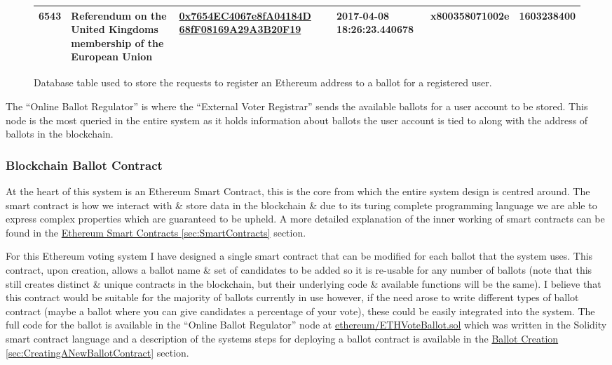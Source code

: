 \documentclass{article}
\begin{document}
\begin{figure}[h]
{\begin{tabular}{ | l | p{4cm} | p{4cm} | p{2.5cm} | p{2.5cm} | l |}
    		6543 & Referendum on the United Kingdoms membership of the European Union & \href{https://etherscan.io/address/0x7654EC4067e8fA04184D68fF08169A29A3B20F19}{0x7654EC4067e8fA04184D
    		68fF08169A29A3B20F19} & 2017-04-08 18:26:23.440678 & x800358071002e & 1603238400  \\ \hline 		
    		
    	\end{tabular}
  	}%
    
	\caption{Database table used to store the requests to register an Ethereum address to a ballot for a registered user.}
\end{figure}

The ``Online Ballot Regulator'' is where the ``External Voter Registrar'' sends the available ballots for a user account to be stored. This node is the most queried in the entire system as it holds information about ballots the user account is tied to along with the address of ballots in the blockchain.

\subsubsection{Blockchain Ballot Contract}
\label{sec:BlockchainBallotContract}
At the heart of this system is an Ethereum Smart Contract, this is the core from which the entire system design is centred around. The smart contract is how we interact with \& store data in the blockchain \& due to its turing complete programming language we are able to express complex properties which are guaranteed to be upheld. A more detailed explanation of the inner working of smart contracts can be found in the \hyperref[sec:SmartContracts]{Ethereum Smart Contracts \ref*{sec:SmartContracts}} section.

For this Ethereum voting system I have designed a single smart contract that can be modified for each ballot that the system uses. This contract, upon creation, allows a ballot name \& set of candidates to be added so it is re-usable for any number of ballots (note that this still creates distinct \& unique contracts in the blockchain, but their underlying code \& available functions will be the same). I believe that this contract would be suitable for the majority of ballots currently in use however, if the need arose to write different types of ballot contract (maybe a ballot where you can give candidates a percentage of your vote), these could be easily integrated into the system. The full code for the ballot is available in the ``Online Ballot Regulator'' node at \href{https://github.com/Mattie432/Blockchain-Voting-System/blob/master/Programming/4_OnlineBallotRegulator/ethereum/ETHVoteBallot.sol}{ethereum/ETHVoteBallot.sol} which was written in the Solidity smart contract language and a description of the systems steps for deploying a ballot contract is available in the \hyperref[sec:CreatingANewBallotContract]{Ballot Creation \ref*{sec:CreatingANewBallotContract}} section. 
\end{document}
